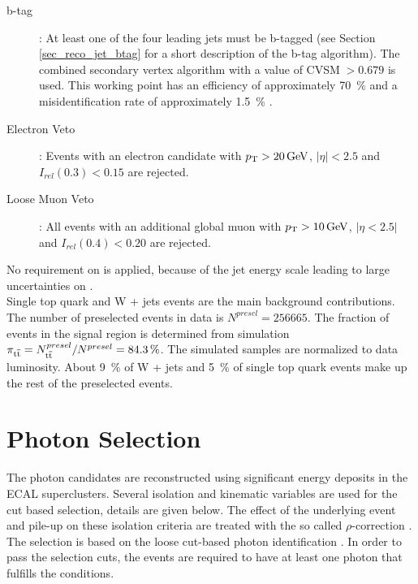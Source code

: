 \begin{description}
\item[b-tag]: At least one of the four leading jets must be b-tagged (see Section \ref{sec_reco_jet_btag} for a short description of the b-tag algorithm). The combined secondary vertex algorithm with a value of CVSM$\;> 0.679$ is used. This working point has an efficiency of approximately \SI{70}{\percent} and a misidentification rate of approximately \SI{1.5}{\percent} \cite{CMS-PAS-TOP-12-027,Chatrchyan:2012jua}.
\item[Electron Veto]: Events with an electron candidate with $p_{\mathrm{T}} > \SI{20}{\giga \electronvolt}$, $| \eta |< 2.5$ and $I_{rel}(0.3)< 0.15$ are rejected.
\item[Loose Muon Veto]: All events with an additional global muon with $p_{\mathrm{T}} > \SI{10}{\giga \electronvolt}$, $|\eta < 2.5|$ and $I_{rel}(0.4)<0.20$ are rejected. 
\end{description}

No requirement on \ETm is applied, because of the jet energy scale leading to large uncertainties on \ETm .\\
Single top quark and W + jets events are the main background contributions. The number of preselected events in data is $N^{presel} =256665$. The fraction of \ttbar events in the \ttgamma signal region is determined from simulation $\pi_{\mathrm{t}\overline{\mathrm{t}}} = N^{presel}_{\mathrm{t}\overline{\mathrm{t}}} / N^{presel} = \SI{84.3}{\percent}$. The simulated samples are normalized to data luminosity. About \SI{9}{\percent} of W + jets and \SI{5}{\percent} of single top quark events make up the rest of the preselected events.\\

\section{Photon Selection}
\label{sec_ttg_sel}

The photon candidates are reconstructed using significant energy deposits in the ECAL superclusters. Several isolation and kinematic variables are used for the cut based selection, details are given below. The effect of the underlying event and pile-up on these isolation criteria are treated with the so called $\rho$-correction \cite{CMS-PAS-PFT-09-001}. The selection is based on the loose cut-based photon identification \cite{CMS-PAS-HIG-13-006}. In order to pass the selection cuts, the events are required to have at least one photon that fulfills the conditions.

